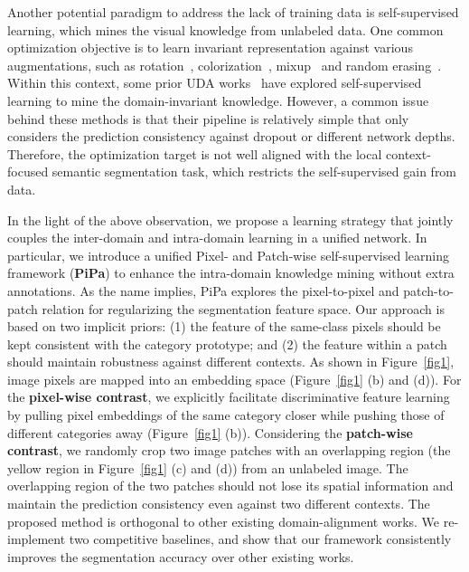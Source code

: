 \documentclass[10pt,twocolumn,letterpaper]{article}
\begin{document}
Another potential paradigm to address the lack of training data is self-supervised learning, which mines the visual knowledge from unlabeled data. 
One common optimization objective is to learn invariant representation against various augmentations, such as rotation~\cite{komodakis2018unsupervised}, colorization~\cite{zhang2016colorful}, mixup~\cite{sun2022self} and random erasing~\cite{zhong2020random}. 
Within this context, some prior UDA works~\cite{zheng2019unsupervised,zheng2021rectifying} have explored self-supervised learning to mine the domain-invariant knowledge. However, a common issue behind these methods is that their pipeline is
relatively simple that only considers the prediction consistency against dropout or different network depths. 
Therefore, the optimization target is not well aligned with the local context-focused semantic segmentation task, which restricts the self-supervised gain from data.

In the light of the above observation, we propose a learning strategy that jointly couples the inter-domain and intra-domain learning in a unified network. In particular, we introduce a unified Pixel- and Patch-wise self-supervised learning framework (\textbf{PiPa}) to enhance the intra-domain knowledge mining without extra annotations. 
As the name implies, PiPa explores the pixel-to-pixel and patch-to-patch relation for regularizing the segmentation feature space. Our approach is based on two implicit priors: (1) the feature of the same-class pixels should be kept consistent with the category prototype; and 
(2) the feature within a patch should maintain robustness against different contexts. As shown in Figure~\ref{fig1}, image pixels are mapped into an embedding space (Figure~\ref{fig1} (b) and (d)). 
For the \textbf{pixel-wise contrast}, we explicitly facilitate discriminative feature learning by pulling pixel embeddings of the same category closer while pushing those of different categories away (Figure~\ref{fig1} 
(b)). Considering the \textbf{patch-wise contrast}, we randomly crop two image patches with an overlapping region (the yellow region in Figure~\ref{fig1} (c) and (d)) from an unlabeled image. The overlapping region of the two patches should not lose its spatial information and maintain the prediction consistency even against two different contexts. 
The proposed method is orthogonal to other existing domain-alignment works. We re-implement two competitive baselines, and show that our framework consistently improves the segmentation accuracy over other existing works.
\end{document}
